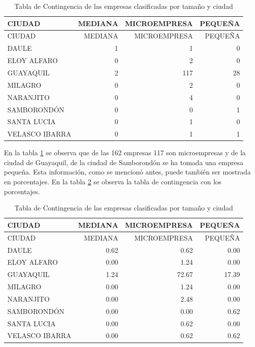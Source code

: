 \documentclass[]{book}
\newenvironment{Shaded}{\begin{snugshade}}{\end{snugshade}}
\newcommand{\DataTypeTok}[1]{\textcolor[rgb]{0.13,0.29,0.53}{#1}}
\newcommand{\DecValTok}[1]{\textcolor[rgb]{0.00,0.00,0.81}{#1}}
\newcommand{\KeywordTok}[1]{\textcolor[rgb]{0.13,0.29,0.53}{\textbf{#1}}}
\newcommand{\NormalTok}[1]{#1}
\newcommand{\OperatorTok}[1]{\textcolor[rgb]{0.81,0.36,0.00}{\textbf{#1}}}
\newcommand{\StringTok}[1]{\textcolor[rgb]{0.31,0.60,0.02}{#1}}
\begin{document}
\begin{longtable}[]{@{}lrrr@{}}
\caption{\label{tab:tabla4}Tabla de Contingencia de las empresas
clasificadas por tamaño y ciudad}\tabularnewline
\toprule
CIUDAD & MEDIANA & MICROEMPRESA & PEQUEÑA\tabularnewline
\midrule
\endfirsthead
\toprule
CIUDAD & MEDIANA & MICROEMPRESA & PEQUEÑA\tabularnewline
\midrule
\endhead
DAULE & 1 & 1 & 0\tabularnewline
ELOY ALFARO & 0 & 2 & 0\tabularnewline
GUAYAQUIL & 2 & 117 & 28\tabularnewline
MILAGRO & 0 & 2 & 0\tabularnewline
NARANJITO & 0 & 4 & 0\tabularnewline
SAMBORONDÓN & 0 & 0 & 1\tabularnewline
SANTA LUCIA & 0 & 1 & 0\tabularnewline
VELASCO IBARRA & 0 & 1 & 1\tabularnewline
\bottomrule
\end{longtable}

En la tabla \ref{tab:tabla4} se observa que de las 162 empresas 117 son microempresas y de la ciudad de Guayaquil, de la ciudad de Samborondón se ha tomada una empresa pequeña. Esta información, como se mencionó antes, puede también ser mostrada en porcentajes. En la tabla \ref{tab:tabla5} se observa la tabla de contingencia con los porcentajes.

\begin{Shaded}
\end{Shaded}

\begin{longtable}[]{@{}lrrr@{}}
\caption{\label{tab:tabla5}Tabla de Contingencia de las empresas
clasificadas por tamaño y ciudad}\tabularnewline
\toprule
CIUDAD & MEDIANA & MICROEMPRESA & PEQUEÑA\tabularnewline
\midrule
\endfirsthead
\toprule
CIUDAD & MEDIANA & MICROEMPRESA & PEQUEÑA\tabularnewline
\midrule
\endhead
DAULE & 0.62 & 0.62 & 0.00\tabularnewline
ELOY ALFARO & 0.00 & 1.24 & 0.00\tabularnewline
GUAYAQUIL & 1.24 & 72.67 & 17.39\tabularnewline
MILAGRO & 0.00 & 1.24 & 0.00\tabularnewline
NARANJITO & 0.00 & 2.48 & 0.00\tabularnewline
SAMBORONDÓN & 0.00 & 0.00 & 0.62\tabularnewline
SANTA LUCIA & 0.00 & 0.62 & 0.00\tabularnewline
VELASCO IBARRA & 0.00 & 0.62 & 0.62\tabularnewline
\bottomrule
\end{longtable}
\end{document}
